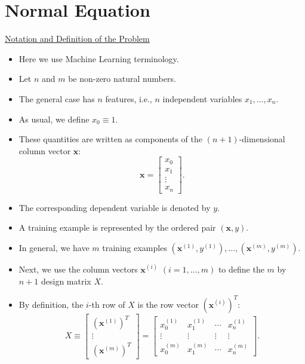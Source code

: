 \documentclass[10pt,american]{scrartcl}
\begin{document}
\section*{Normal Equation}

\uline{Notation and Definition of the Problem}
\begin{itemize}
\item Here we use Machine Learning terminology.
\item Let $n$ and $m$ be non-zero natural numbers.
\item The general case has $n$ features, i.e., $n$ independent variables
$x_{1},\ldots,x_{n}$.
\item As usual, we define $x_{0}\equiv1$.
\item These quantities are written as components of the $\left(n+1\right)$-dimensional
column vector $\mathbf{x}$:
\[
\mathbf{x}=\begin{bmatrix}x_{0}\\
x_{1}\\
\vdots\\
x_{n}
\end{bmatrix}.
\]
\item The corresponding dependent variable is denoted by $y$.
\item A training example is represented by the ordered pair $\left(\mathbf{x},y\right)$.
\item In general, we have $m$ training examples $\left(\mathbf{x}^{\left(1\right)},y^{\left(1\right)}\right),\ldots,\left(\mathbf{x}^{\left(m\right)},y^{\left(m\right)}\right)$.
\item Next, we use the column vectors $\mathbf{x}^{\left(i\right)}$ $\left(i=1,\ldots,m\right)$
to define the $m$ by $n+1$ design matrix $X$.
\item By definition, the $i$-th row of $X$ is the row vector $\left(\mathbf{x}^{\left(i\right)}\right)^{T}$:
\[
X\equiv\begin{bmatrix}\left(\mathbf{x}^{\left(1\right)}\right)^{T}\\
\vdots\\
\left(\mathbf{x}^{\left(m\right)}\right)^{T}
\end{bmatrix}=\begin{bmatrix}x_{0}^{\left(1\right)} & x_{1}^{\left(1\right)} & \cdots & x_{n}^{\left(1\right)}\\
\vdots & \vdots & \vdots & \vdots\\
x_{0}^{\left(m\right)} & x_{1}^{\left(m\right)} & \cdots & x_{n}^{\left(m\right)}
\end{bmatrix}.
\]
\end{itemize}
\end{document}
